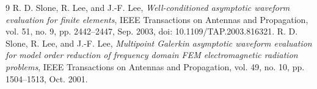 \documentclass[11pt,a4paper]{ctexart}
\begin{document}
\begin{thebibliography}{9}
 R. D. Slone, R. Lee, and J.-F. Lee, \emph{Well-conditioned asymptotic waveform evaluation for finite elements}, IEEE Transactions on Antennas and Propagation, vol. 51, no. 9, pp. 2442--2447, Sep. 2003, doi: 10.1109/TAP.2003.816321.
 R. D. Slone, R. Lee, and J.-F. Lee, \emph{Multipoint Galerkin asymptotic waveform evaluation for model order reduction of frequency domain FEM electromagnetic radiation problems}, IEEE Transactions on Antennas and Propagation, vol. 49, no. 10, pp. 1504--1513, Oct. 2001.
\end{thebibliography}
\end{document}
